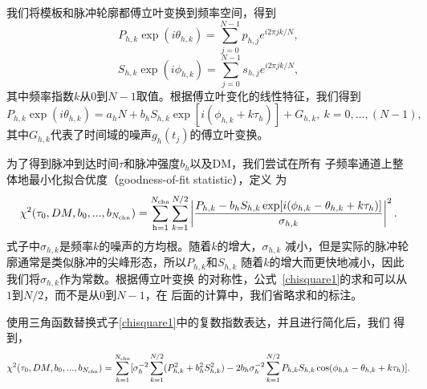我们将模板和脉冲轮廓都傅立叶变换到频率空间，得到
\begin{equation}
P_{h,k}\exp(i\theta_{h,k})=\sum_{j=0}^{N-1}p_{h,j}e^{i2\pi jk/N},
\end{equation}
\begin{equation}
S_{h,k}\exp(i\phi_{h,k})=\sum_{j=0}^{N-1}s_{h,j}e^{i2\pi jk/N},
\end{equation}
%
其中频率指数$k$从0到$N-1$取值。根据傅立叶变化的线性特征，我们得到
%
\begin{equation}
\label{eq1}
P_{h,k}\exp(i\theta_{h,k})=a_{h}N+b_{h}S_{h,k}\exp[i(\phi_{h,k}+k\tau_{h})]+G_{h,k},
\ k=0,...,(N-1),
\end{equation}
%
其中$G_{h,k}$代表了时间域的噪声$g_{h}(t_j)$的傅立叶变换。

为了得到脉冲到达时间$\tau$和脉冲强度$b_{h}$以及DM，我们尝试在所有
子频率通道上整体地最小化拟合优度（goodness-of-fit statistic），定义
为
\begin{equation}
\label{chisquare1}
\chi^{2}(\tau_{0},DM,b_{0},...,b_{N_{\rm{chn}}})=\sum_{\rm{h}=1}^{N_{\rm{chn}}}\sum_{k=1}^{N/2}\left|\frac{P_{h,k}-b_{h}S_{h,k}\exp[i(\phi_{h,k}-\theta_{h,k}+k\tau_{h})]}{\sigma_{h,k}}\right|^2.
\end{equation}
%
式子中$\sigma_{h,k}$是频率$k$的噪声的方均根。随着$k$的增大，$\sigma_{h,k}$
减小，但是实际的脉冲轮廓通常是类似脉冲的尖峰形态，所以$P_{h,k}$和$S_{h,k}$
随着$k$的增大而更快地减小，因此我们将$\sigma_{h,k}$作为常数。根据傅立叶变换
的对称性，公式~\ref{chisquare1}的求和可以从$1$到$N/2$，而不是从0到$N-1$，在
后面的计算中，我们省略求和的标注。

使用三角函数替换式子\ref{chisquare1}中的复数指数表达，并且进行简化后，我们
得到，
\begin{equation}
\label{chisquare2}
\chi^{2}(\tau_{0},DM,b_{0},...,b_{N_{\rm{chn}}})=\sum_{h=1}^{N_{\rm{chn}}}[\sigma_{h}^{-2}\sum_{k=1}^{N/2}(P_{h,k}^2+b_{h}^{2}S_{h,k}^2)-2b_{h}\sigma_{h}^{-2}\sum_{k=1}^{N/2}P_{h,k}S_{h,k}\cos(\phi_{h,k}-\theta_{h,k}+k\tau_{h})].
\end{equation}

